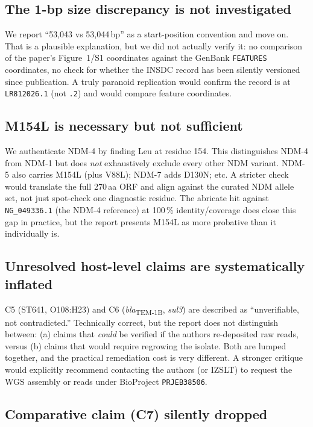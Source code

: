 \documentclass[11pt,a4paper]{article}
\newcommand{\blaTEM}{\textit{bla}\textsubscript{TEM-1B}}
\begin{document}
\subsection*{The 1-bp size discrepancy is not investigated}

We report ``53{,}043 vs 53{,}044\,bp'' as a start-position convention
and move on. That is a plausible explanation, but we did not actually
verify it: no comparison of the paper's Figure~1/S1 coordinates against
the GenBank \texttt{FEATURES} coordinates, no check for whether the
INSDC record has been silently versioned since publication. A truly
paranoid replication would confirm the record is at
\texttt{LR812026.1} (not \texttt{.2}) and would compare feature
coordinates.

\subsection*{M154L is necessary but not sufficient}

We authenticate NDM-4 by finding Leu at residue 154. This distinguishes
NDM-4 from NDM-1 but does \emph{not} exhaustively exclude every other
NDM variant. NDM-5 also carries M154L (plus V88L); NDM-7 adds D130N;
etc. A stricter check would translate the full 270\,aa ORF and align
against the curated NDM allele set, not just spot-check one diagnostic
residue. The abricate hit against \texttt{NG\_049336.1} (the NDM-4
reference) at 100\,\% identity/coverage does close this gap in
practice, but the report presents M154L as more probative than it
individually is.

\subsection*{Unresolved host-level claims are systematically inflated}

C5 (ST641, O108:H23) and C6 (\blaTEM, \textit{sul3}) are described as
``unverifiable, not contradicted.'' Technically correct, but the report
does not distinguish between: (a) claims that \emph{could} be verified
if the authors re-deposited raw reads, versus (b) claims that would
require regrowing the isolate. Both are lumped together, and the
practical remediation cost is very different. A stronger critique
would explicitly recommend contacting the authors (or IZSLT) to
request the WGS assembly or reads under BioProject
\texttt{PRJEB38506}.

\subsection*{Comparative claim (C7) silently dropped}
\end{document}
